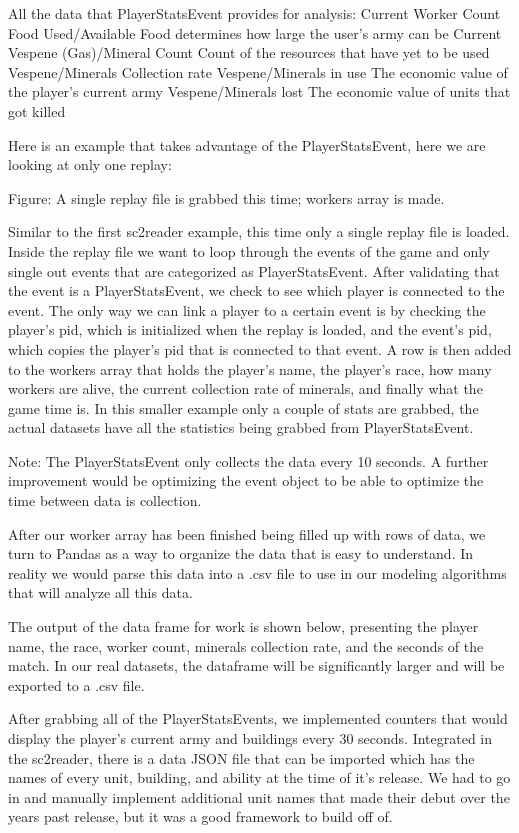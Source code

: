 \documentclass[a4paper,12pt]{report}
\begin{document}
All the data that PlayerStatsEvent provides for analysis:
Current Worker Count
Food Used/Available
Food determines how large the user’s army can be
Current Vespene (Gas)/Mineral Count
Count of the resources that have yet to be used
Vespene/Minerals Collection rate
Vespene/Minerals in use
The economic value of the player’s current army
Vespene/Minerals lost
The economic value of units that got killed

Here is an example that takes advantage of the PlayerStatsEvent, here we are looking at only one replay:

Figure: A single replay file is grabbed this time; workers array is made.

Similar to the first sc2reader example, this time only a single replay file is loaded. Inside the replay file we want to loop through the events of the game and only single out events that are categorized as PlayerStatsEvent. After validating that the event is a PlayerStatsEvent, we check to see which player is connected to the event. The only way we can link a player to a certain event is by checking the player’s pid, which is initialized when the replay is loaded, and the event’s pid, which copies the player’s pid that is connected to that event. A row is then added to the workers array that holds the player’s name, the player’s race, how many workers are alive, the current collection rate of minerals, and finally what the game time is. In this smaller example only a couple of stats are grabbed, the actual datasets have all the statistics being grabbed from PlayerStatsEvent.

Note: The PlayerStatsEvent only collects the data every 10 seconds. A further improvement would be optimizing the event object to be able to optimize the time between data is collection.

After our worker array has been finished being filled up with rows of data, we turn to Pandas as a way to organize the data that is easy to understand. In reality we would parse this data into a .csv file to use in our modeling algorithms that will analyze all this data.

The output of the data frame for work is shown below, presenting the player name, the race, worker count, minerals collection rate, and the seconds of the match. In our real datasets, the dataframe will be significantly larger and will be exported to a .csv file. 

After grabbing all of the PlayerStatsEvents, we implemented counters that would display the player’s current army and buildings every 30 seconds. Integrated in the sc2reader, there is a data JSON file that can be imported which has the names of every unit, building, and ability at the time of it’s release. We had to go in and manually implement additional unit names that made their debut over the years past release, but it was a good framework to build off of. 
\end{document}
